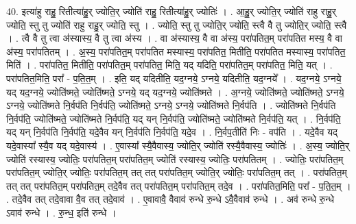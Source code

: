\documentclass[17pt]{extarticle}
\begin{document}
40. इत्या॑हु राहु॒ रितीत्या॑हु॒र् ज्योति॒र् ज्योति॑ राहु॒ रितीत्या॑हु॒र् ज्योतिः॑ । . आ॒हु॒र् ज्योति॒र् ज्योति॑ राहु राहु॒र् ज्योति॒ स्तु तु ज्योति॑ राहु राहु॒र् ज्योति॒ स्तु । . ज्योति॒ स्तु तु ज्योति॒र् ज्योति॒ स्त्वै वै तु ज्योति॒र् ज्योति॒ स्त्वै । . त्वै वै तु त्वा अ॑स्यास्य॒ वै तु त्वा अ॑स्य । . वा अ॑स्यास्य॒ वै वा अ॑स्य॒ परा॑पतित॒म् परा॑पतित मस्य॒ वै वा अ॑स्य॒ परा॑पतितम् । . अ॒स्य॒ परा॑पतित॒म् परा॑पतित मस्यास्य॒ परा॑पतित॒ मितीति॒ परा॑पतित मस्यास्य॒ परा॑पतित॒ मिति॑ । . परा॑पतित॒ मितीति॒ परा॑पतित॒म् परा॑पतित॒ मिति॒ यद् यदिति॒ परा॑पतित॒म् परा॑पतित॒ मिति॒ यत् । . परा॑पतित॒मिति॒ परा᳚ - प॒ति॒त॒म् । . इति॒ यद् यदितीति॒ यद॒ग्नये॒ ऽग्नये॒ यदितीति॒ यद॒ग्नये᳚ । . यद॒ग्नये॒ ऽग्नये॒ यद् यद॒ग्नये॒ ज्योति॑ष्मते॒ ज्योति॑ष्मते॒ ऽग्नये॒ यद् यद॒ग्नये॒ ज्योति॑ष्मते । . अ॒ग्नये॒ ज्योति॑ष्मते॒ ज्योति॑ष्मते॒ ऽग्नये॒ ऽग्नये॒ ज्योति॑ष्मते नि॒र्वप॑ति नि॒र्वप॑ति॒ ज्योति॑ष्मते॒ ऽग्नये॒ ऽग्नये॒ ज्योति॑ष्मते नि॒र्वप॑ति । . ज्योति॑ष्मते नि॒र्वप॑ति नि॒र्वप॑ति॒ ज्योति॑ष्मते॒ ज्योति॑ष्मते नि॒र्वप॑ति॒ यद् यन् नि॒र्वप॑ति॒ ज्योति॑ष्मते॒ ज्योति॑ष्मते नि॒र्वप॑ति॒ यत् । . नि॒र्वप॑ति॒ यद् यन् नि॒र्वप॑ति नि॒र्वप॑ति॒ यदे॒वैव यन् नि॒र्वप॑ति नि॒र्वप॑ति॒ यदे॒व । . नि॒र्वप॒तीति॑ निः - वप॑ति । . यदे॒वैव यद् यदे॒वास्या᳚ स्यै॒व यद् यदे॒वास्य॑ । . ए॒वास्या᳚ स्यै॒वैवास्य॒ ज्योति॒र् ज्योति॑ रस्यै॒वैवास्य॒ ज्योतिः॑ । . अ॒स्य॒ ज्योति॒र् ज्योति॑ रस्यास्य॒ ज्योतिः॒ परा॑पतित॒म् परा॑पतित॒म् ज्योति॑ रस्यास्य॒ ज्योतिः॒ परा॑पतितम् । . ज्योतिः॒ परा॑पतित॒म् परा॑पतित॒म् ज्योति॒र् ज्योतिः॒ परा॑पतित॒म् तत् तत् परा॑पतित॒म् ज्योति॒र् ज्योतिः॒ परा॑पतित॒म् तत् । . परा॑पतित॒म् तत् तत् परा॑पतित॒म् परा॑पतित॒म् तदे॒वैव तत् परा॑पतित॒म् परा॑पतित॒म् तदे॒व । . परा॑पतित॒मिति॒ परा᳚ - प॒ति॒त॒म् । . तदे॒वैव तत् तदे॒वावा वै॒व तत् तदे॒वाव॑ । . ए॒वावावै॒ वैवाव॑ रुन्धे रु॒न्धे ऽवै॒वैवाव॑ रुन्धे । . अव॑ रुन्धे रु॒न्धे ऽवाव॑ रुन्धे । . रु॒न्ध॒ इति॑ रुन्धे । \newline
\pagebreak
{}
\end{document}
